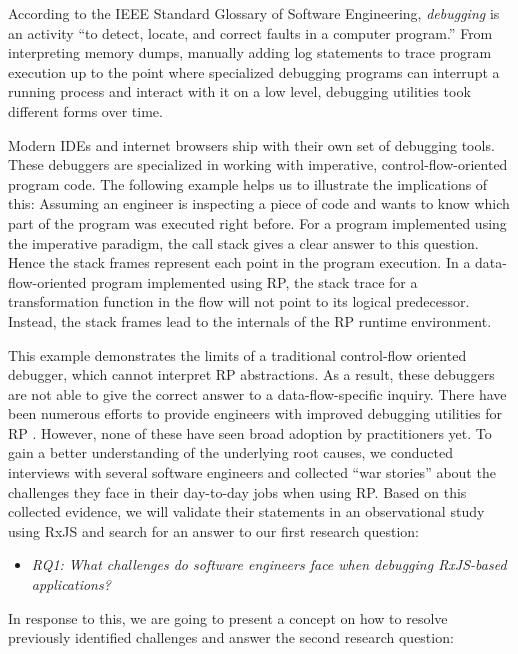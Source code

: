 \documentclass[sigplan,screen,review]{acmart}
\begin{document}
According to the IEEE Standard Glossary of Software Engineering, \emph{debugging} is an activity ``to detect, locate, and correct faults in a computer program.''\cite{ieeeglossary} From interpreting memory dumps, manually adding log statements to trace program execution up to the point where specialized debugging programs can interrupt a running process and interact with it on a low level, debugging utilities took different forms over time.

Modern IDEs and internet browsers ship with their own set of debugging tools. These debuggers are specialized in working with imperative, control-flow-oriented program code. The following example helps us to illustrate the implications of this: Assuming an engineer is inspecting a piece of code and wants to know which part of the program was executed right before. For a program implemented using the imperative paradigm, the call stack gives a clear answer to this question. Hence the stack frames represent each point in the program execution. In a data-flow-oriented program implemented using RP, the stack trace for a transformation function in the flow will not point to its logical predecessor. Instead, the stack frames lead to the internals of the RP runtime environment.

This example demonstrates the limits of a traditional control-flow oriented debugger, which cannot interpret RP abstractions. As a result, these debuggers are not able to give the correct answer to a data-flow-specific inquiry. There have been numerous efforts to provide engineers with improved debugging utilities for RP \cite{10.1145/2577080.2577083} \cite{10.1145/2884781.2884815} \cite{10.1145/3180155.3180156}. However, none of these have seen broad adoption by practitioners yet. To gain a better understanding of the underlying root causes, we conducted interviews with several software engineers and collected ``war stories'' about the challenges they face in their day-to-day jobs when using RP. Based on this collected evidence, we will validate their statements in an observational study using RxJS and search for an answer to our first research question:

\begin{itemize}
	\item \emph{RQ1: What challenges do software engineers face when debugging RxJS-based applications?}
\end{itemize}

In response to this, we are going to present a concept on how to resolve previously identified challenges and answer the second research question:
\end{document}
